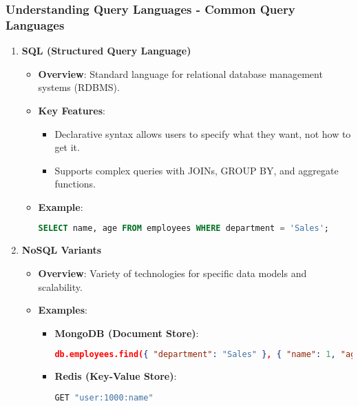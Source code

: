 \documentclass[aspectratio=169]{beamer}
\begin{document}
\begin{frame}[fragile]
    \frametitle{Understanding Query Languages - Common Query Languages}
    \begin{enumerate}
        \item \textbf{SQL (Structured Query Language)}
        \begin{itemize}
            \item \textbf{Overview}: Standard language for relational database management systems (RDBMS).
            \item \textbf{Key Features}:
            \begin{itemize}
                \item Declarative syntax allows users to specify what they want, not how to get it.
                \item Supports complex queries with JOINs, GROUP BY, and aggregate functions.
            \end{itemize}
            \item \textbf{Example}:
            \begin{lstlisting}[language=SQL]
SELECT name, age FROM employees WHERE department = 'Sales';
            \end{lstlisting}
        \end{itemize}
        
        \item \textbf{NoSQL Variants}
        \begin{itemize}
            \item \textbf{Overview}: Variety of technologies for specific data models and scalability.
            \item \textbf{Examples}:
            \begin{itemize}
                \item \textbf{MongoDB (Document Store)}:
                \begin{lstlisting}[language=JSON]
db.employees.find({ "department": "Sales" }, { "name": 1, "age": 1 });
                \end{lstlisting}
                \item \textbf{Redis (Key-Value Store)}:
                \begin{lstlisting}[language=bash]
GET "user:1000:name"
                \end{lstlisting}
            \end{itemize}
        \end{itemize}
    \end{enumerate}
\end{frame}
\end{document}
